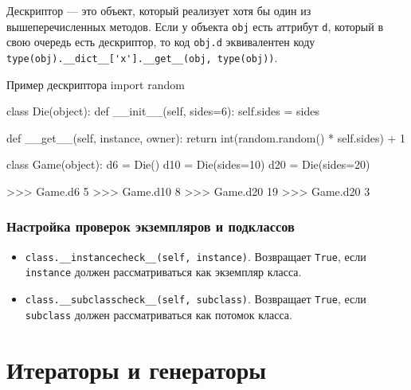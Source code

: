 Дескриптор --- это объект, который реализует хотя бы один из вышеперечисленных методов. Если у объекта \lstinline{obj} есть аттрибут \lstinline{d}, который в свою очередь есть дескриптор, то код \lstinline{obj.d} эквивалентен коду \lstinline{type(obj).__dict__['x'].__get__(obj, type(obj))}.

\begin{pylst}{Пример дескриптора}{}
import random

class Die(object):
    def __init__(self, sides=6):
        self.sides = sides

    def __get__(self, instance, owner):
        return int(random.random() * self.sides) + 1

class Game(object):
    d6 = Die()
    d10 = Die(sides=10)
    d20 = Die(sides=20)

>>> Game.d6
5
>>> Game.d10
8
>>> Game.d20
19
>>> Game.d20
3
\end{pylst}

\subsubsection{Настройка проверок экземпляров и подклассов}
\begin{itemize}
  \item \lstinline{class.__instancecheck__(self, instance)}. Возвращает \lstinline{True}, если \lstinline{instance} должен рассматриваться как экземпляр класса.
  \item \lstinline{class.__subclasscheck__(self, subclass)}. Возвращает \lstinline{True}, если \lstinline{subclass} должен рассматриваться как потомок класса.
\end{itemize}

\section{Итераторы и генераторы}
\label{sec:py-iterators}

